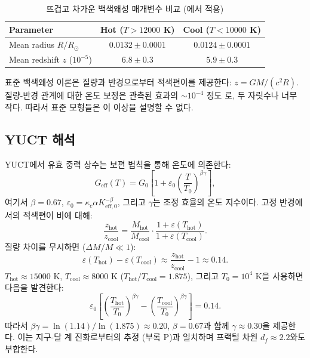 \documentclass[11pt,a4paper]{article}
\newcommand{\df}{d_{\!f}}
\newcommand{\kappac}{\kappa_c}
\newcommand{\alp}{\alpha}
\newcommand{\eps}{\varepsilon}
\theoremstyle{remark}
\begin{document}
	\begin{table}[H]
		\begin{otherlanguage}{english}
			\centering
			\caption{Comparison of hot and cool white dwarf parameters (adapted from \cite{Crumpler2024})}
			\label{tab:wd-results}
			\begin{tabular}{lcc}
				\toprule
				\textbf{Parameter} & \textbf{Hot (\(T>12000\) K)} & \textbf{Cool (\(T<10000\) K)} \\
				\midrule
				Mean radius \(R/R_\odot\) & \(0.0132 \pm 0.0001\) & \(0.0124 \pm 0.0001\) \\
				Mean redshift \(z\) (\(10^{-5}\)) & \(6.8 \pm 0.3\) & \(5.9 \pm 0.3\) \\
				\bottomrule
			\end{tabular}
		\end{otherlanguage}
		\caption{뜨겁고 차가운 백색왜성 매개변수 비교 (\cite{Crumpler2024}에서 적용)}
	\end{table}
	
	표준 백색왜성 이론은 질량과 반경으로부터 적색편이를 제공한다: \(z = GM/(c^2 R)\). 질량-반경 관계에 대한 온도 보정은 관측된 효과의 \(\sim 10^{-4}\) 정도 \cite{Fontaine2001}로, 두 자릿수나 너무 작다. 따라서 표준 모형들은 이 이상을 설명할 수 없다.
	
	\subsection{YUCT 해석}
	\label{subsec:wd-yuct-interp}
	
	YUCT에서 유효 중력 상수는 보편 법칙을 통해 온도에 의존한다:
	\[
	G_{\mathrm{eff}}(T) = G_0\left[1 + \eps_0 \left(\frac{T}{T_0}\right)^{\beta\gamma}\right],
	\]
	여기서 \(\beta = 0.67\), \(\eps_0 = \kappac \alp K_{\mathrm{eff},0}^{-\beta}\), 그리고 \(\gamma\)는 조정 효율의 온도 지수이다. 고정 반경에서의 적색편이 비에 대해:
	\[
	\frac{z_{\mathrm{hot}}}{z_{\mathrm{cool}}} = \frac{M_{\mathrm{hot}}}{M_{\mathrm{cool}}} \cdot \frac{1 + \eps(T_{\mathrm{hot}})}{1 + \eps(T_{\mathrm{cool}})}.
	\]
	질량 차이를 무시하면 (\(\Delta M/M \ll 1\)):
	\[
	\eps(T_{\mathrm{hot}}) - \eps(T_{\mathrm{cool}}) \approx \frac{z_{\mathrm{hot}}}{z_{\mathrm{cool}}} - 1 \approx 0.14.
	\]
	\(T_{\mathrm{hot}} \approx 15000\) K, \(T_{\mathrm{cool}} \approx 8000\) K (\(T_{\mathrm{hot}}/T_{\mathrm{cool}} = 1.875\)), 그리고 \(T_0 = 10^4\) K을 사용하면 다음을 발견한다:
	\[
	\eps_0 \left[\left(\frac{T_{\mathrm{hot}}}{T_0}\right)^{\beta\gamma} - \left(\frac{T_{\mathrm{cool}}}{T_0}\right)^{\beta\gamma}\right] = 0.14.
	\]
	따라서 \(\beta\gamma = \ln(1.14)/\ln(1.875) \approx 0.20\), \(\beta = 0.67\)과 함께 \(\gamma \approx 0.30\)을 제공한다. 이는 지구-달 계 진화로부터의 추정 \cite{Lantink2022, Farhat2022} (부록 P)과 일치하며 프랙털 차원 \(\df \approx 2.2\)와도 부합한다.
	
\end{document}
